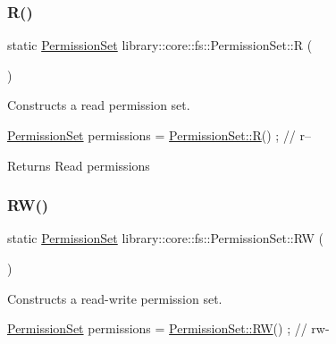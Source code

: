 \subsubsection{\texorpdfstring{R()}{R()}}
{\footnotesize\ttfamily static \hyperlink{classlibrary_1_1core_1_1fs_1_1PermissionSet}{Permission\+Set} library\+::core\+::fs\+::\+Permission\+Set\+::R (\begin{DoxyParamCaption}{ }\end{DoxyParamCaption})\hspace{0.3cm}{\ttfamily [static]}}



Constructs a read permission set. 


\begin{DoxyCode}
\hyperlink{classlibrary_1_1core_1_1fs_1_1PermissionSet_a8a6eb39cc2a8bca92a657d065d3e36ba}{PermissionSet} permissions = \hyperlink{classlibrary_1_1core_1_1fs_1_1PermissionSet_a48d447273c118d6a7c81aebb505189c6}{PermissionSet::R}() ; \textcolor{comment}{// r--}
\end{DoxyCode}


\begin{DoxyReturn}{Returns}
Read permissions 
\end{DoxyReturn}
\mbox{\label{classlibrary_1_1core_1_1fs_1_1PermissionSet_a9722204cdc11a0171e1a115d449a134b}} 
\subsubsection{\texorpdfstring{R\+W()}{RW()}}
{\footnotesize\ttfamily static \hyperlink{classlibrary_1_1core_1_1fs_1_1PermissionSet}{Permission\+Set} library\+::core\+::fs\+::\+Permission\+Set\+::\+RW (\begin{DoxyParamCaption}{ }\end{DoxyParamCaption})\hspace{0.3cm}{\ttfamily [static]}}



Constructs a read-\/write permission set. 


\begin{DoxyCode}
\hyperlink{classlibrary_1_1core_1_1fs_1_1PermissionSet_a8a6eb39cc2a8bca92a657d065d3e36ba}{PermissionSet} permissions = \hyperlink{classlibrary_1_1core_1_1fs_1_1PermissionSet_a9722204cdc11a0171e1a115d449a134b}{PermissionSet::RW}() ; \textcolor{comment}{// rw-}
\end{DoxyCode}



